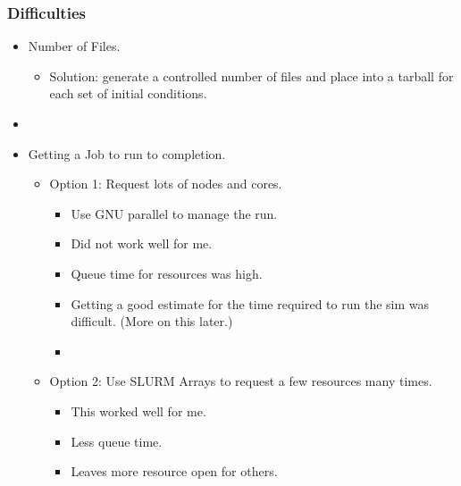 \documentclass[10pt]{beamer}
\begin{document}
\begin{frame}
  \frametitle{Difficulties}
  \begin{itemize}
    \item Number of Files.
      \begin{itemize} 
        \item Solution: generate a controlled number of files and place into a
          tarball for each set of initial conditions.
      \end{itemize}

    \item[]

    \item Getting a Job to run to completion.
      \begin{itemize}
        \item Option 1: Request lots of nodes and cores.
          \begin{itemize}
            \item Use GNU parallel to manage the run.
            \item Did not work well for me.
            \item Queue time for resources was high.
            \item Getting a good estimate for the time required to run the sim
              was difficult. (More on this later.)
            \item[]
          \end{itemize}
        \item Option 2: Use SLURM Arrays to request a few resources many times.
          \begin{itemize}
            \item This worked well for me.
            \item Less queue time.
            \item Leaves more resource open for others.
          \end{itemize}
      \end{itemize}
  \end{itemize}
\end{frame}
\end{document}
